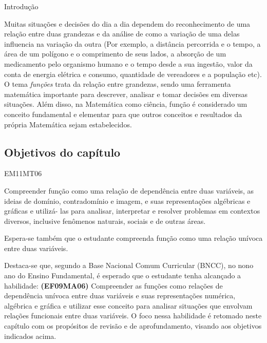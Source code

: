 \mainmatter

\begin{apresentacao}{Introdução}

Muitas situações e decisões do dia a dia dependem do reconhecimento de uma relação entre duas grandezas e da análise de como a variação de uma delas influencia na variação da outra (Por exemplo, a distância percorrida e o tempo, a área de um polígono e o comprimento de seus lados, a absorção de um medicamento pelo organismo humano e o tempo desde a sua ingestão, valor da conta de energia elétrica e consumo, quantidade de vereadores e a população etc). O tema \textit{funções} trata da relação entre grandezas, sendo uma ferramenta matemática importante para descrever, analisar e tomar decisões em diversas situações. Além disso, na Matemática como ciência, função é considerado um conceito fundamental e elementar para que outros conceitos e resultados da própria Matemática sejam estabelecidos.

\subsection{Objetivos do capítulo}

\begin{habilities}{EM11MT06}

Compreender função como uma relação de dependência entre duas variáveis, as ideias de domínio, contradomínio e imagem, e suas representações algébricas e gráficas e utilizá- las para analisar, interpretar e resolver problemas em contextos diversos, inclusive fenômenos naturais, sociais e de outras áreas.

Espera-se também que o estudante compreenda função como uma relação unívoca entre duas variáveis.
\end{habilities}

Destaca-se que, segundo a Base Nacional Comum Curricular (BNCC), no nono ano do Ensino Fundamental, é esperado que o estudante tenha alcançado a habilidade: \textbf{(EF09MA06)} Compreender as funções como relações de dependência unívoca entre duas variáveis e suas representações numérica, algébrica e gráfica e utilizar esse conceito para analisar situações que envolvam relações funcionais entre duas variáveis. O foco nessa habilidade é retomado neste capítulo com os propósitos de revisão e de aprofundamento, visando aos objetivos indicados acima.


\end{apresentacao}
